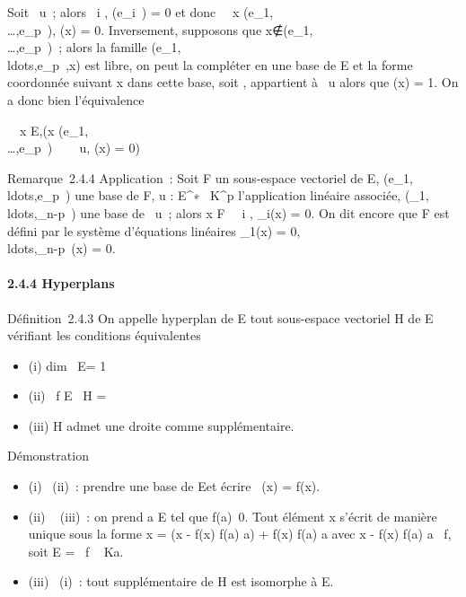 \documentclass[]{article}
\begin{document}
Soit \phi \in\mathrmKer~u~; alors
\forall~i \in [1,p], \phi(e_i~) = 0 et donc
\forall~~x
\in\mathrmVect(e_1,\\\ldots,e_p~),
\phi(x) = 0. Inversement, supposons que
x∉\mathrmVect(e_1,\\\ldots,e_p~)~;
alors la famille
(e_1,\\ldots,e_p~,x)
est libre, on peut la compléter en une base de E et la forme coordonnée
suivant x dans cette base, soit \phi, appartient à
\mathrmKer~u alors que \phi(x)
= 1. On a donc bien l'équivalence

\forall~~x \in E,\quad (x
\in\mathrmVect(e_1,\\\ldots,e_p~)
\Leftrightarrow \forall~~\phi
\in\mathrmKer~u, \phi(x) = 0)

Remarque~2.4.4 Application~: Soit F un sous-espace vectoriel de E,
(e_1,\\ldots,e_p~)
une base de F, u : E^∗\rightarrow~ K^p l'application linéaire
associée,
(\phi_1,\\ldots,\phi_n-p~)
une base de \mathrmKer~u~;
alors x \in F \Leftrightarrow \forall~~i \in
[1,n - p], \phi_i(x) = 0. On dit encore que F est défini par
le système d'équations linéaires \phi_1(x) =
0,\\ldots,\phi_n-p~(x)
= 0.

\paragraph{2.4.4 Hyperplans}

Définition~2.4.3 On appelle hyperplan de E tout sous-espace vectoriel H
de E vérifiant les conditions équivalentes

\begin{itemize}
\itemsep1pt\parskip0pt
\item
  (i) dim~ E\diagupH = 1
\item
  (ii) \exists~f \in E
  \diagdown\0\, H =\
  \mathrmKerf
\item
  (iii) H admet une droite comme supplémentaire.
\end{itemize}

Démonstration

\begin{itemize}
\itemsep1pt\parskip0pt
\item
  (i) \rigtharrow~(ii)~: prendre \overlinee une base de E\diagupH et
  écrire \pi~(x) = f(x)\overlinee.
\item
  (ii) \rigtharrow~ (iii)~: on prend a \in E tel que
  f(a)\neq~0. Tout élément x s'écrit de manière
  unique sous la forme x = (x - f(x) \over f(a) a)
  + f(x) \over f(a) a avec x - f(x)
  \over f(a) a
  \in\mathrmKer~f, soit E
  = \mathrmKer~f \oplus~ Ka.
\item
  (iii) \rigtharrow~(i)~: tout supplémentaire de H est isomorphe à E\diagupH.
\end{itemize}
\end{document}
